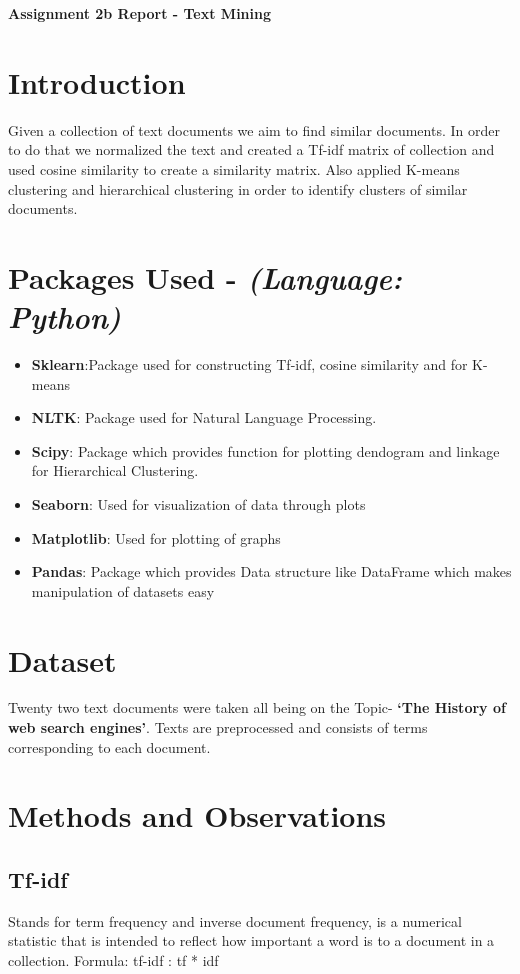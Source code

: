 \documentclass[7pt,a4paper]{article}
\begin{document}
\textbf{\LARGE Assignment 2b Report - Text Mining}
\section{Introduction}
Given a collection of text documents we aim to find similar documents. In order to do that we normalized the text and created a Tf-idf matrix of collection and used cosine similarity to create a similarity matrix. Also applied K-means clustering and hierarchical clustering in order to identify clusters of similar documents.

\section{Packages Used - \textit{(Language: Python)}}
\begin{itemize}
\item{\textbf{Sklearn}:Package used for constructing Tf-idf, cosine similarity and for K-means}
\item{\textbf{NLTK}: Package used for Natural Language Processing.}
\item{\textbf{Scipy}: Package which provides function for plotting dendogram and linkage for Hierarchical Clustering.}
\item{\textbf{Seaborn}: Used for visualization of data through plots}
\item{\textbf{Matplotlib}: Used for plotting of graphs}
\item{\textbf{Pandas}: Package which provides Data structure like DataFrame which makes
manipulation of datasets easy}
\end{itemize}

\section{Dataset}
Twenty two text documents were taken all being on the Topic- \textbf{‘The History of web search engines’}. Texts are preprocessed and consists of terms corresponding to each document. 

\section{Methods and Observations}
\subsection{Tf-idf}
Stands for term frequency and inverse document frequency, is a numerical statistic that is intended to reflect how important a word is to a document in a collection.
Formula: tf-idf : tf * idf 
 				 
\end{document}
